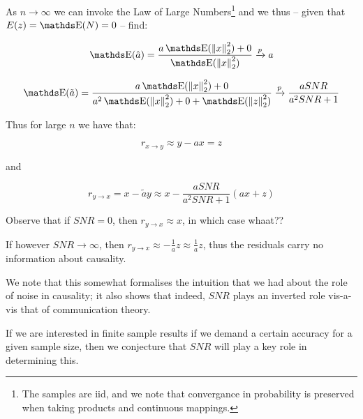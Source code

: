 As $n \rightarrow \infty$ we can invoke the Law of Large Numbers\footnote{The samples are iid, 
and we note that convergance in probability is preserved when taking products and 
continuous mappings.} and we thus -- given that $E(z) = \E(N) = 0$ -- find:

$$
    \E(\hat{a}) = \frac{a\E(\norm{x}_2^2) + 0}{\E(\norm{x}_2^2)} \xrightarrow{p} a 
$$

$$
    \E(\tilde{a}) = \frac{a\E(\norm{x}_2^2) + 0}{
        a^2 \E(\norm{x}_2^2) + 0 + \E(\norm{z}^2_2)} \xrightarrow{p}
        \frac{a SNR}{a^2 SNR + 1}
$$

Thus for large $n$ we have that:

$$
    r_{x \rightarrow y} \approx y - ax = z
$$

and

$$
    r_{y \rightarrow x} = x - \tilde{a}y \approx x - \frac{a SNR}{a^2 SNR + 1} (ax + z) 
$$

Observe that if $SNR = 0$, then $r_{y \rightarrow x} \approx x$, in which case whaat??

If however $SNR \rightarrow \infty$, then $r_{y \rightarrow x} \approx -\frac{1}{a}z \approx \frac{1}{a}z$, thus 
the residuals carry no information about causality.

We note that this somewhat formalises the intuition that we had about the role of noise in 
causality; it also shows that indeed, $SNR$ plays an inverted role vis-a-vis that of communication
theory. 

If we are interested in finite sample results if we demand a certain accuracy for a given
sample size, then we conjecture that $SNR$ will play a key role in determining this.
